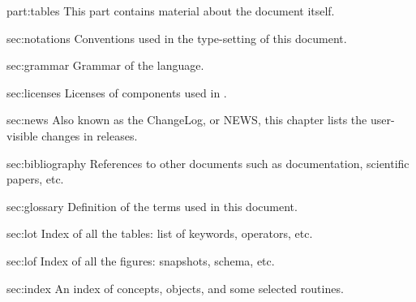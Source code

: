 
\begin{partDescription}{part:tables}
  {
    This part contains material about the document itself.
  }
\item[sec:notations]%
  Conventions used in the type-setting of this document.

\item[sec:grammar]%
  Grammar of the \us language.

\item[sec:licenses]%
  Licenses of components used in \usdk.

\item[sec:news]%
  Also known as the \urbi ChangeLog, or \urbi NEWS, this chapter lists the
  user-visible changes in \usdk releases.

\item[sec:bibliography]%
  References to other documents such as documentation, scientific papers,
  etc.

\item[sec:glossary]%
  Definition of the terms used in this document.

\item[sec:lot]%
  Index of all the tables: list of keywords, operators, etc.

\item[sec:lof]%
  Index of all the figures: snapshots, schema, etc.

\item[sec:index]%
  An index of concepts, objects, and some selected routines.
\end{partDescription}



